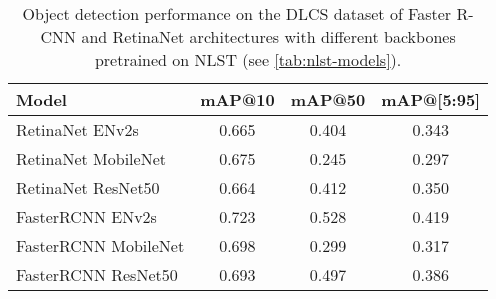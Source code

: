 \begin{table}[h]
    \centering
    \begin{tabular}{lccc}
        \hline
        \textbf{Model} & \textbf{mAP@10} & \textbf{mAP@50} & \textbf{mAP@[5:95]} \\
        \hline
        RetinaNet ENv2s      & 0.665 & 0.404 & 0.343 \\
        RetinaNet MobileNet  & 0.675 & 0.245 & 0.297 \\
        RetinaNet ResNet50   & 0.664 & 0.412 & 0.350 \\
        FasterRCNN ENv2s     & 0.723 & 0.528 & 0.419 \\
        FasterRCNN MobileNet & 0.698 & 0.299 & 0.317 \\
        FasterRCNN ResNet50  & 0.693 & 0.497 & 0.386 \\
        \hline
    \end{tabular}
    \caption{Object detection performance on the DLCS dataset of Faster R-CNN and RetinaNet architectures with different backbones pretrained on NLST (see \ref{tab:nlst-models}).}
    \label{tab:dlcs-models-pretrained}
\end{table}